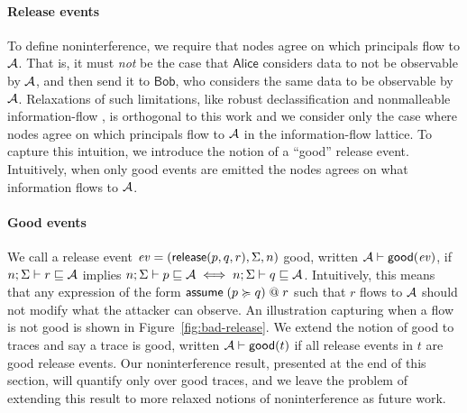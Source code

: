 \paragraph{Release events}\label{sec:release-events}
To define noninterference, we require that nodes agree on which principals flow to $\mathcal{A}$. That is, it must \emph{not} be the case that $\mathsf{Alice}$ considers data to not be observable by $\mathcal{A}$, and then send it to $\mathsf{Bob}$, who considers the same data to be observable by $\mathcal{A}$. Relaxations of such limitations, like robust declassification \cite{Zdancewic:2001:RD:872752.873524, Myers:2004:ERD:1009380.1009673} and nonmalleable information-flow \cite{Cecchetti:2017:NIF:3133956.3134054}, is orthogonal to this work and we consider only the case where nodes agree on which principals flow to $\mathcal{A}$ in the information-flow lattice. To capture this intuition, we introduce the notion of a ``good'' release event. Intuitively, when only good events are emitted the nodes agrees on what information flows to $\mathcal{A}$.

\paragraph{Good events}
We call a release event $\mathit{ev} = (\mathsf{release}(p, q, r), \Sigma, n)$ good, written $\mathcal{A} \vdash \mathsf{good}(\mathit{ev})$, if $n; \Sigma \vdash r \sqsubseteq \mathcal{A}$ implies $n; \Sigma \vdash p \sqsubseteq \mathcal{A} \iff n; \Sigma \vdash q \sqsubseteq \mathcal{A}$. Intuitively, this means that any expression of the form $\mathsf{assume}\;(p \succcurlyeq q) \;@ \; r$ such that $r$ flows to $\mathcal{A}$ should not modify what the attacker can observe. An illustration capturing when a flow is not good is shown in Figure~\ref{fig:bad-release}. We extend the notion of good to traces and say a trace is good, written $\mathcal{A} \vdash \mathsf{good}(t)$ if all release events in $t$ are good release events. Our noninterference result, presented at the end of this section, will quantify only over good traces, and we leave the problem of extending this result to more relaxed notions of noninterference as future work.

